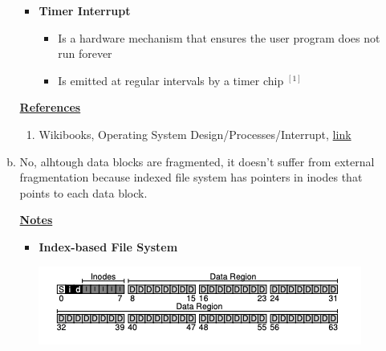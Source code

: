 \documentclass[12pt]{article}
\begin{document}
\begin{enumerate}[1.]
\begin{enumerate}[a)]
\begin{itemize}
\begin{itemize}
            \end{itemize}

            \item \textbf{Timer Interrupt}

            \begin{itemize}
                \item Is a hardware mechanism that ensures the user program does not run forever
                \item Is emitted at regular intervals by a timer chip $^{[1]}$
            \end{itemize}
        \end{itemize}

        \bigskip

        \underline{\textbf{References}}

        \begin{enumerate}[1)]
            \item Wikibooks, Operating System Design/Processes/Interrupt, \href{https://en.wikibooks.org/wiki/Operating_System_Design/Processes/Interrupt#:~:text=Perhaps%20the%20most%20important%20interrupt,processor%20executing%20a%20specific%20instruction.}{link}
        \end{enumerate}

        \item

        \bigskip

        No, alhtough data blocks are fragmented, it doesn't suffer from external
        fragmentation because indexed file system has pointers in inodes that
        points to each data block.

        \bigskip

        \underline{\textbf{Notes}}

        \begin{itemize}

            \item \textbf{Index-based File System}

            \begin{center}

            \includegraphics[width=\linewidth]{images/midterm_1_solution_8.png}
            \end{center}


\end{itemize}
\end{enumerate}
\end{enumerate}
\end{document}
